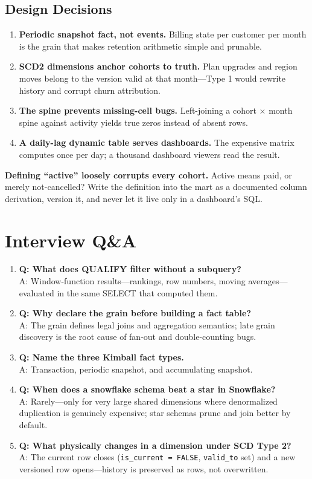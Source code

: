 \subsection{Design Decisions}
\begin{enumerate}
    \item \textbf{Periodic snapshot fact, not events.} Billing state per customer per month is the grain that makes retention arithmetic simple and prunable.
    \item \textbf{SCD2 dimensions anchor cohorts to truth.} Plan upgrades and region moves belong to the version valid at that month---Type 1 would rewrite history and corrupt churn attribution.
    \item \textbf{The spine prevents missing-cell bugs.} Left-joining a cohort $\times$ month spine against activity yields true zeros instead of absent rows.
    \item \textbf{A daily-lag dynamic table serves dashboards.} The expensive matrix computes once per day; a thousand dashboard viewers read the result.
\end{enumerate}

\begin{pitfall}
\textbf{Defining ``active'' loosely corrupts every cohort.} Active means paid, or merely not-cancelled? Write the definition into the mart as a documented column derivation, version it, and never let it live only in a dashboard's SQL.
\end{pitfall}

\section{Interview Q\&A}
\begin{enumerate}
    \item \textbf{Q: What does QUALIFY filter without a subquery?}\\
    A: Window-function results---rankings, row numbers, moving averages---evaluated in the same SELECT that computed them.
    \item \textbf{Q: Why declare the grain before building a fact table?}\\
    A: The grain defines legal joins and aggregation semantics; late grain discovery is the root cause of fan-out and double-counting bugs.
    \item \textbf{Q: Name the three Kimball fact types.}\\
    A: Transaction, periodic snapshot, and accumulating snapshot.
    \item \textbf{Q: When does a snowflake schema beat a star in Snowflake?}\\
    A: Rarely---only for very large shared dimensions where denormalized duplication is genuinely expensive; star schemas prune and join better by default.
    \item \textbf{Q: What physically changes in a dimension under SCD Type 2?}\\
    A: The current row closes (\texttt{is\_current = FALSE}, \texttt{valid\_to} set) and a new versioned row opens---history is preserved as rows, not overwritten.
\end{enumerate}

